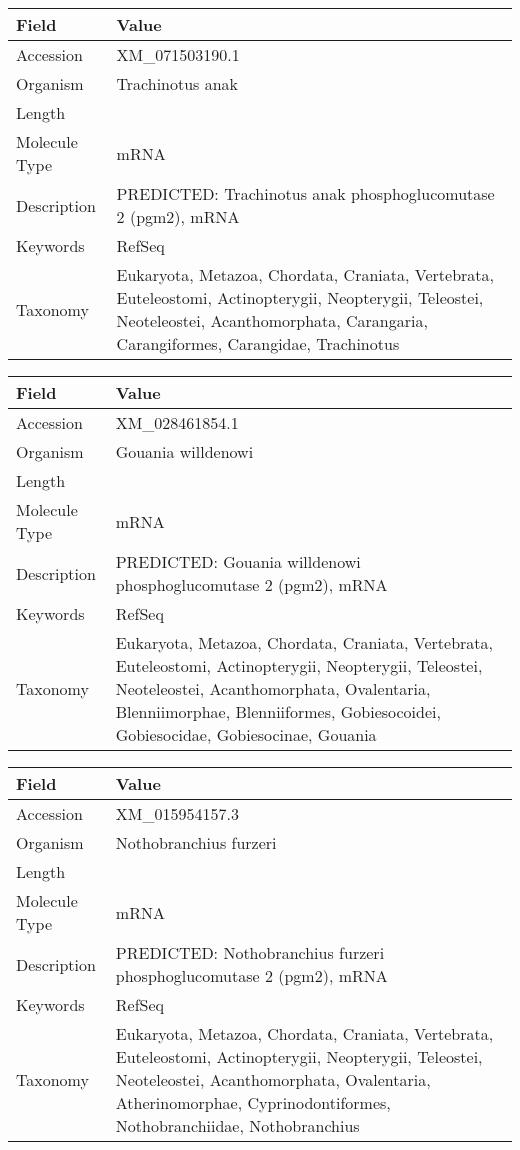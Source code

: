 \documentclass[10pt]{article}
\begin{document}
\vspace{1em}
{\footnotesize
\begin{longtable}{>{\raggedright\arraybackslash}p{4.5cm} >{\raggedright\arraybackslash}p{11.5cm}}
\textbf{Field} & \textbf{Value} \\
\hline
Accession & XM\_071503190.1 \\
Organism & Trachinotus anak \\
Length & 3036 \\
Molecule Type & mRNA \\
Description & PREDICTED: Trachinotus anak phosphoglucomutase 2 (pgm2), mRNA \\
Keywords & RefSeq \\
Taxonomy & Eukaryota, Metazoa, Chordata, Craniata, Vertebrata, Euteleostomi, Actinopterygii, Neopterygii, Teleostei, Neoteleostei, Acanthomorphata, Carangaria, Carangiformes, Carangidae, Trachinotus \\
\end{longtable}
}

\vspace{1em}
{\footnotesize
\begin{longtable}{>{\raggedright\arraybackslash}p{4.5cm} >{\raggedright\arraybackslash}p{11.5cm}}
\textbf{Field} & \textbf{Value} \\
\hline
Accession & XM\_028461854.1 \\
Organism & Gouania willdenowi \\
Length & 3992 \\
Molecule Type & mRNA \\
Description & PREDICTED: Gouania willdenowi phosphoglucomutase 2 (pgm2), mRNA \\
Keywords & RefSeq \\
Taxonomy & Eukaryota, Metazoa, Chordata, Craniata, Vertebrata, Euteleostomi, Actinopterygii, Neopterygii, Teleostei, Neoteleostei, Acanthomorphata, Ovalentaria, Blenniimorphae, Blenniiformes, Gobiesocoidei, Gobiesocidae, Gobiesocinae, Gouania \\
\end{longtable}
}

\vspace{1em}
{\footnotesize
\begin{longtable}{>{\raggedright\arraybackslash}p{4.5cm} >{\raggedright\arraybackslash}p{11.5cm}}
\textbf{Field} & \textbf{Value} \\
\hline
Accession & XM\_015954157.3 \\
Organism & Nothobranchius furzeri \\
Length & 2455 \\
Molecule Type & mRNA \\
Description & PREDICTED: Nothobranchius furzeri phosphoglucomutase 2 (pgm2), mRNA \\
Keywords & RefSeq \\
Taxonomy & Eukaryota, Metazoa, Chordata, Craniata, Vertebrata, Euteleostomi, Actinopterygii, Neopterygii, Teleostei, Neoteleostei, Acanthomorphata, Ovalentaria, Atherinomorphae, Cyprinodontiformes, Nothobranchiidae, Nothobranchius \\
\end{longtable}
}
\end{document}
